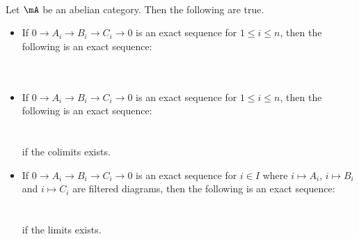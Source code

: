 \documentclass[a4paper]{article}
\begin{document}
\begin{lmm}{}{}\\
Let $\mA$ be an abelian category. Then the following are true. 
\begin{itemize}
\item If $0\to A_i\to B_i\to C_i\to 0$ is an exact sequence for $1\leq i\leq n$, then the following is an exact sequence: \\~\\
\\
\item If $0\to A_i\to B_i\to C_i\to 0$ is an exact sequence for $1\leq i\leq n$, then the following is an exact sequence: \\~\\
\\
if the colimits exists. 
\item If $0\to A_i\to B_i\to C_i\to 0$ is an exact sequence for $i\in I$ where $i\mapsto A_i$, $i\mapsto B_i$ and $i\mapsto C_i$ are filtered diagrams, then the following is an exact sequence: \\~\\
\\
if the limits exists. 
\end{itemize}
\end{lmm}
\end{document}

